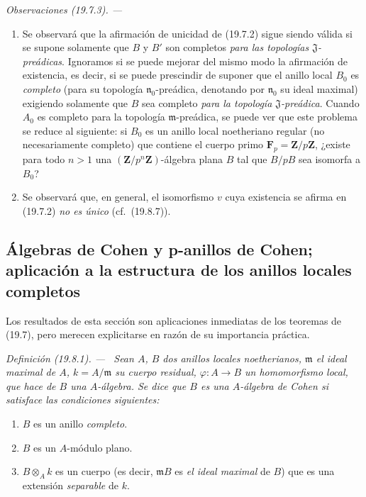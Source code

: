 \documentclass[10pt,oneside]{book}
\makeatletter
\newcommand{\setmanualcurrentlabel}[1]{\def\@currentlabel{#1}}
\newenvironment{definition}[1][]{%
  \setmanualcurrentlabel{#1}\par\medskip\noindent\itshape Definición (#1). ---\ }{\par}
\newenvironment{remarks}[1][]{%
  \setmanualcurrentlabel{#1}\par\medskip\noindent\itshape Observaciones (#1). ---\ }{\par}
\makeatother
\begin{document}
\begin{remarks}[19.7.3]
\label{0.19.7.3-es}
\begin{enumerate}
  \item[(i)] Se observará que la afirmación de unicidad de (19.7.2) sigue siendo
  válida si se supone solamente que $B$ y $B'$ son completos \emph{para
  las topologías $\mathfrak J$-preádicas}. Ignoramos si se puede
  mejorar del mismo modo la afirmación de existencia, es decir, si se puede
  prescindir de suponer que el anillo local $B_0$ es \emph{completo} (para su topología
  $\mathfrak n_0$-preádica, denotando por $\mathfrak n_0$ su ideal
  maximal) exigiendo solamente que $B$ sea completo \emph{para la topología
  $\mathfrak J$-preádica}. Cuando $A_0$ es completo para la topología
  $\mathfrak m$-preádica, se puede ver que este problema se reduce al siguiente:
  si $B_0$ es un anillo local noetheriano regular (no necesariamente
  completo) que contiene el cuerpo primo $\mathbf F_p=\mathbf Z/p\mathbf Z$,
  ¿existe para todo $n>1$ una $(\mathbf Z/p^n\mathbf Z)$-álgebra plana $B$
  tal que $B/pB$ sea isomorfa a $B_0$?
  \item[(ii)] Se observará que, en general, el isomorfismo $v$ cuya existencia se
  afirma en (19.7.2) \emph{no es único} (cf.~(19.8.7)).
\end{enumerate}
\end{remarks}

\subsection{Álgebras de Cohen y p-anillos de Cohen; aplicación a la
estructura de los anillos locales completos}
\label{subsection:0.19.8-es}

Los resultados de esta sección son aplicaciones inmediatas de los teoremas
de (19.7), pero merecen explicitarse en razón de su importancia
práctica.

\begin{definition}[19.8.1]
\label{0.19.8.1-es}
Sean $A$, $B$ dos anillos locales noetherianos, $\mathfrak m$ el ideal maximal
de $A$, $k=A/\mathfrak m$ su cuerpo residual,
$\varphi:A\to B$ un homomorfismo local, que hace de $B$ una $A$-álgebra. Se
dice que $B$ es una $A$-álgebra de Cohen si satisface las condiciones
siguientes:
\begin{enumerate}
  \item[(i)] $B$ es un anillo \emph{completo}.
  \item[(ii)] $B$ es un $A$-módulo plano.
  \item[(iii)] $B\otimes_A k$ es un cuerpo \textup{(es decir,
  $\mathfrak mB$ es \emph{el ideal maximal} de $B$)} que es una extensión
  \emph{separable} de $k$.
\end{enumerate}
\end{definition}
\end{document}
